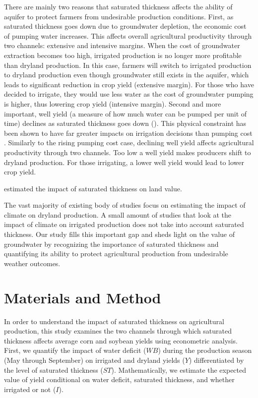 \documentclass[
]{article}
\begin{document}
There are mainly two reasons that saturated thickness affects the ability of aquifer to protect farmers from undesirable production conditions. First, as saturated thickness goes down due to groundwater depletion, the economic cost of pumping water increases. This affects overall agricultural productivity through two channels: extensive and intensive margins. When the cost of groundwater extraction becomes too high, irrigated production is no longer more profitable than dryland production. In this case, farmers will switch to irrigated production to dryland production even though groundwater still exists in the aquifer, which leads to significant reduction in crop yield (extensive margin). For those who have decided to irrigate, they would use less water as the cost of groundwater pumping is higher, thus lowering crop yield (intensive margin). Second and more important, well yield (a measure of how much water can be pumped per unit of time) declines as saturated thickness goes down (). This physical constraint has been shown to have far greater impacts on irrigation decisions than pumping cost \citep{mieno2021}. Similarly to the rising pumping cost case, declining well yield affects agricultural productivity through two channels. Too low a well yield makes producers shift to dryland production. For those irrigating, a lower well yield would lead to lower crop yield.

\citet{sampson2019} estimated the impact of saturated thickness on land value.

The vast majority of existing body of studies focus on estimating the impact of climate on dryland production. A small amount of studies that look at the impact of climate on irrigated production does not take into account saturated thickness. Our study fills this important gap and sheds light on the value of groundwater by recognizing the importance of saturated thickness and quantifying its ability to protect agricultural production from undesirable weather outcomes.

\citep{rad2020effects}
\citep{foster2014modeling}
\citep{foster2015analysis}

\hypertarget{materials-and-method}{%
\section{Materials and Method}\label{materials-and-method}}

In order to understand the impact of saturated thickness on agricultural production, this study examines the two channels through which saturated thickness affects average corn and soybean yields using econometric analysis. First, we quantify the impact of water deficit (\(WB\)) during the production season (May through September) on irrigated and dryland yields (\(Y\)) differentiated by the level of saturated thickness (\(ST\)). Mathematically, we estimate the expected value of yield conditional on water deficit, saturated thickness, and whether irrigated or not (\(I\)).
\end{document}
